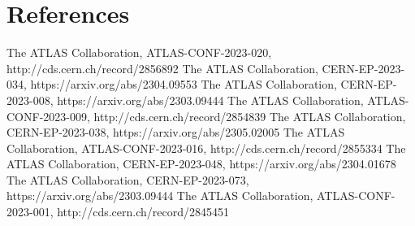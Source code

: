 \documentclass{moriond}
\begin{document}
\section*{References}

\begin{thebibliography}{99}

 The ATLAS Collaboration, ATLAS-CONF-2023-020, http://cds.cern.ch/record/2856892
 The ATLAS Collaboration, CERN-EP-2023-034, https://arxiv.org/abs/2304.09553
 The ATLAS Collaboration, CERN-EP-2023-008, https://arxiv.org/abs/2303.09444
 The ATLAS Collaboration, ATLAS-CONF-2023-009, http://cds.cern.ch/record/2854839
 The ATLAS Collaboration, CERN-EP-2023-038, https://arxiv.org/abs/2305.02005
 The ATLAS Collaboration, ATLAS-CONF-2023-016, http://cds.cern.ch/record/2855334
 The ATLAS Collaboration, CERN-EP-2023-048, https://arxiv.org/abs/2304.01678
 The ATLAS Collaboration, CERN-EP-2023-073, https://arxiv.org/abs/2303.09444
 The ATLAS Collaboration, ATLAS-CONF-2023-001, http://cds.cern.ch/record/2845451

\end{thebibliography}
\end{document}
